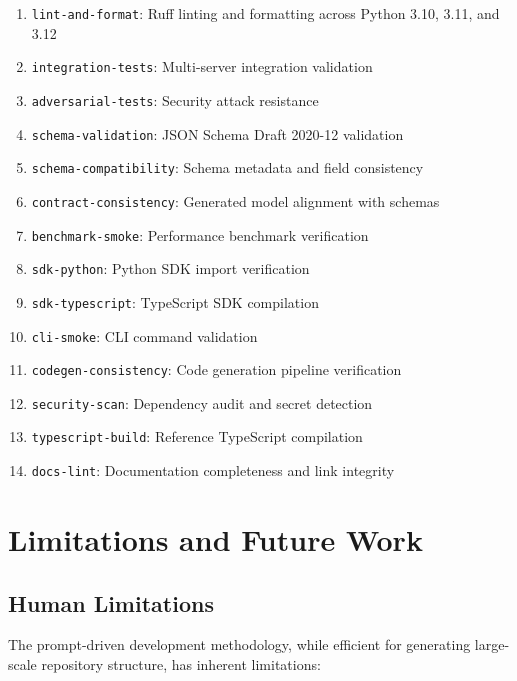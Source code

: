 \begin{enumerate}[leftmargin=*]
\item \texttt{lint-and-format}: Ruff linting and formatting across Python 3.10, 3.11, and 3.12
\item \texttt{integration-tests}: Multi-server integration validation
\item \texttt{adversarial-tests}: Security attack resistance
\item \texttt{schema-validation}: JSON Schema Draft 2020-12 validation
\item \texttt{schema-compatibility}: Schema metadata and field consistency
\item \texttt{contract-consistency}: Generated model alignment with schemas
\item \texttt{benchmark-smoke}: Performance benchmark verification
\item \texttt{sdk-python}: Python SDK import verification
\item \texttt{sdk-typescript}: TypeScript SDK compilation
\item \texttt{cli-smoke}: CLI command validation
\item \texttt{codegen-consistency}: Code generation pipeline verification
\item \texttt{security-scan}: Dependency audit and secret detection
\item \texttt{typescript-build}: Reference TypeScript compilation
\item \texttt{docs-lint}: Documentation completeness and link integrity
\end{enumerate}

\section{Limitations and Future Work}
\label{sec:limitations}

\subsection{Human Limitations}

The prompt-driven development methodology, while efficient for generating large-scale repository structure, has inherent limitations:

